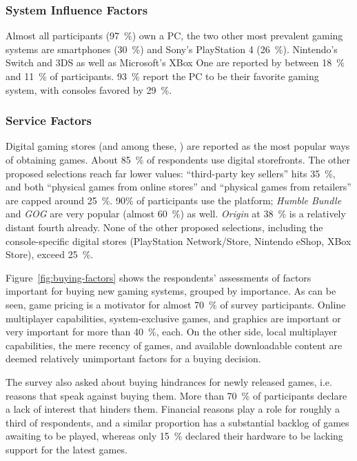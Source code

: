 \subsubsection{System Influence Factors}
Almost all participants (\SI{97}{\percent}) own a PC, the two other most prevalent
gaming systems are smartphones (\SI{30}{\percent}) and Sony's PlayStation 4 (\SI{26}{\percent}).
Nintendo's Switch and 3DS as well as Microsoft's XBox One are reported
by between \SI{18}{\percent} and \SI{11}{\percent} of participants.
\SI{93}{\percent} report the PC to be their favorite gaming system, with consoles
favored by \SI{29}{\percent}.



\subsubsection{Service Factors}

Digital gaming stores (and among these, \steam) are reported as
the most popular ways of obtaining games. About \SI{85}{\percent} of respondents
use digital storefronts. The other proposed selections reach far lower
values: ``third-party key sellers'' hits \SI{35}{\percent}, and both ``physical
games from online stores'' and ``physical games from retailers''
are capped around \SI{25}{\percent}.
90\% of participants use the \steam platform; \textit{Humble Bundle}
and \textit{GOG} are very popular (almost \SI{60}{\percent}) as well. \textit{Origin}
at \SI{38}{\percent} is a relatively distant fourth already. None of the other
proposed selections, including the console-specific digital stores
(PlayStation Network/Store, Nintendo eShop, XBox Store), exceed
\SI{25}{\percent}.

Figure~\ref{fig:buying-factors} shows the respondents' assessments
of factors important for buying new gaming systems, grouped by
importance. As can be seen, game pricing is a motivator for
almost \SI{70}{\percent} of survey participants. Online multiplayer capabilities,
system-exclusive games, and graphics are important or very important
for more than \SI{40}{\percent}, each. On the other side, local multiplayer
capabilities, the mere recency of games, and available downloadable
content are deemed relatively unimportant factors for a buying decision.

The survey also asked about buying hindrances for newly released 
games, i.e. reasons that speak against buying them.
More than \SI{70}{\percent} of participants declare a lack of interest
that hinders them. Financial reasons play a role for roughly
a third of respondents, and a similar proportion has a substantial
backlog of games awaiting to be played, whereas only \SI{15}{\percent} declared
their hardware to be lacking support for the latest games.


